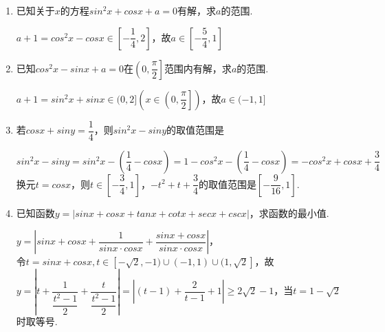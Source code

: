 \begin{enumerate}
\begin{enumerate}
\begin{enumerate}
\begin{jieda}
\begin{dingautolist}{172}
                    令 $t = \cos x + \sin x = \sqrt{2}\sin \left( {x + \dfrac{\pi }{4}}\right)$ ,则 $t \in  \left\lbrack  {-\sqrt{2},\sqrt{2}}\right\rbrack$，$f(x) = g\left( t\right)  = {t}^{2} + \sqrt{2}t - 1 \in \left[-\dfrac{3}{2}, 3\right]$
                \end{dingautolist}
            \end{jieda}

            \item 已知关于$x$的方程$sin^2x+cosx+a = 0$有解，求$a$的范围.
            \begin{jieda}
                $a+1 = cos^2x - cosx \in \left[-\dfrac{1}{4}, 2\right]$，故$a \in \left[-\dfrac{5}{4}, 1\right]$
            \end{jieda}
            \item 已知$cos^2x - sinx + a = 0$在$\left(0, \dfrac{\pi}{2}\right]$范围内有解，求$a$的范围.
            \begin{jieda}
                $a+1 = sin^2x + sinx \in (0, 2] \left(x \in \left(0, \dfrac{\pi}{2}\right]\right)$，故$a \in (-1, 1]$
            \end{jieda}

            \item 若$cosx + siny = \dfrac{1}{4}$，则$sin^2x - siny$的取值范围是
            \begin{jieda}
            $sin^2x - siny = sin^2x - \left(\dfrac{1}{4} - cosx\right) = 1 - cos^2x - \left(\dfrac{1}{4} - cosx\right) = -cos^2x + cosx + \dfrac{3}{4}$ \\
            换元$t = cosx$，则$t \in \left[-\dfrac{3}{4}, 1\right]$，$-t^2 + t + \dfrac{3}{4}$的取值范围是$\left[-\dfrac{9}{16}, 1 \right]$.
            \end{jieda}

            \item 已知函数$y = |sinx + cosx + tanx + cotx + secx + cscx|$，求函数的最小值.
            \begin{jieda}
                $y = \left|sinx + cosx + \dfrac{1}{sinx \cdot cosx} + \dfrac{sinx + cosx}{sinx \cdot cosx}\right|$，\\
                令$t = sinx + cosx, t \in [-\sqrt{2}, -1) \cup (-1, 1) \cup (1, \sqrt{2}]$，故$y = \left|t + \dfrac{1}{\dfrac{t^2 - 1}{2}} + \dfrac{t}{\dfrac{t^2 - 1}{2}}\right| = |(t-1) + \dfrac{2}{t-1} + 1| \geq 2\sqrt{2} - 1$，当$t = 1-\sqrt{2}$时取等号.
            \end{jieda}


\end{enumerate}
\end{enumerate}
\end{enumerate}
